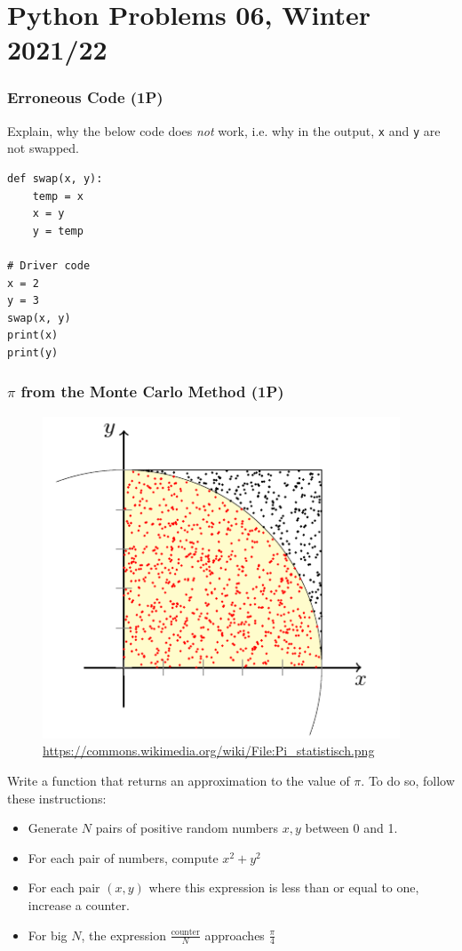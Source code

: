 \documentclass[
	english,
	fontsize=10pt,
	parskip=half,
	titlepage=true,
	DIV=12
]{scrartcl}
\newcommand*{\ie}{i.\;e. }
\begin{document}
\part*{Python Problems 06, Winter 2021/22}
\section{Erroneous Code (1\;P)}
Explain, why the below code does \emph{not} work, \ie why in the output, \texttt{x} and \texttt{y} are not swapped.
\begin{verbatim}
def swap(x, y): 
    temp = x
    x = y
    y = temp
  
# Driver code 
x = 2
y = 3
swap(x, y) 
print(x) 
print(y) 
\end{verbatim}

\section{$\pi$ from the Monte Carlo Method (1\;P)}
\begin{figure}
\vspace{-20pt}
\includegraphics[width=\linewidth]{MCarlo}
\caption{\url{https://commons.wikimedia.org/wiki/File:Pi_statistisch.png}}
\label{fig:MCPI}
\vspace{-40pt}
\end{figure}
%
Write a function that returns an approximation to the value of $\pi$. To do so, follow these instructions:
\begin{itemize}
\item Generate $N$ pairs of positive random numbers $x, y$ between 0 and 1.
\item For each pair of numbers, compute $x^2 + y^2$
\item For each pair $(x, y)$ where this expression is less than or equal to one, increase a counter.
\item For big $N$, the expression $\frac{\text{counter}}{N}$ approaches $\frac{\pi}{4}$
\end{itemize}
\end{document}
